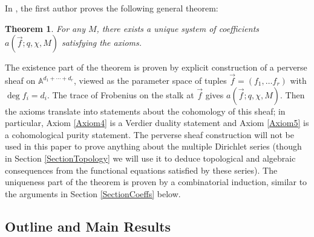 \documentclass[11pt,letterpaper]{article}
\newtheorem{theorem}{Theorem}[section]
\theoremstyle{definition}
\theoremstyle{remark}
\numberwithin{equation}{section}
\theoremstyle{dotless}
\begin{document}
In \cite[Theorem 1.1]{s-amds}, the first author proves the following general theorem:
\begin{theorem}
For any $M$, there exists a unique system of coefficients $a(\vec{f}; q, \chi, M)$ satisfying the axioms.
\end{theorem}
\noindent The existence part of the theorem is proven by explicit construction of a perverse sheaf on $\mathbb{A}^{d_1+\cdots+d_r}$, viewed as the parameter space of tuples $\vec{f}=(f_1, \ldots f_r)$ with $\deg f_i=d_i$. The trace of Frobenius on the stalk at $\vec{f}$ gives $a(\vec{f}; q, \chi, M)$. Then the axioms translate into statements about the cohomology of this sheaf; in particular, Axiom \ref{Axiom4} is a Verdier duality statement and Axiom \ref{Axiom5} is a cohomological purity statement. The perverse sheaf construction will not be used in this paper to prove anything about the multiple Dirichlet series (though in Section \ref{SectionTopology} we will use it to deduce topological and algebraic consequences from the functional equations satisfied by these series). The uniqueness part of the theorem is proven by a combinatorial induction, similar to the arguments in Section \ref{SectionCoeffs} below.

\subsection{Outline and Main Results}
\end{document}
